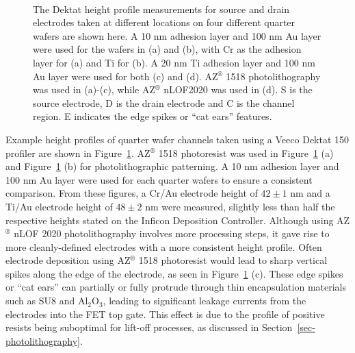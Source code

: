 \documentclass[
  a4paper,
]{scrbook}
\begin{document}
\begin{figure}
\begin{minipage}[t]{0.45\linewidth}
{{}

}

\end{minipage}%
%
\begin{minipage}[t]{0.01\linewidth}

{\centering 

~

}

\end{minipage}%

\caption[The Dektat height profile measurements for source and drain
electrodes taken at different locations on four different quarter
wafers.]{\label{fig-electrodes-dektat}The Dektat height profile
measurements for source and drain electrodes taken at different
locations on four different quarter wafers are shown here. A 10 nm
adhesion layer and 100 nm Au layer were used for the wafers in (a) and
(b), with Cr as the adhesion layer for (a) and Ti for (b). A 20 nm Ti
adhesion layer and 100 nm Au layer were used for both (c) and (d).
AZ\(^\circledR\) 1518 photolithography was used in (a)-(c), while
AZ\(^\circledR\) nLOF2020 was used in (d). S is the source electrode, D
is the drain electrode and C is the channel region. E indicates the edge
spikes or ``cat ears'' features.}

\end{figure}

Example height profiles of quarter wafer channels taken using a Veeco
Dektat 150 profiler are shown in Figure~\ref{fig-electrodes-dektat}.
AZ\(^\circledR\) 1518 photoresist was used in
Figure~\ref{fig-electrodes-dektat} (a) and
Figure~\ref{fig-electrodes-dektat} (b) for photolithographic patterning.
A 10 nm adhesion layer and 100 nm Au layer were used for each quarter
wafers to ensure a consistent comparison. From these figures, a Cr/Au
electrode height of \(42 \pm 1\) nm and a Ti/Au electrode height of
\(48 \pm 2\) nm were measured, slightly less than half the respective
heights stated on the Inficon Deposition Controller. Although using
AZ\(^\circledR\) nLOF 2020 photolithography involves more processing
steps, it gave rise to more cleanly-defined electrodes with a more
consistent height profile. Often electrode deposition using
AZ\(^\circledR\) 1518 photoresist would lead to sharp vertical spikes
along the edge of the electrode, as seen in
Figure~\ref{fig-electrodes-dektat} (c). These edge spikes or ``cat
ears'' can partially or fully protrude through thin encapsulation
materials such as SU8 and Al\(_2\)O\(_3\), leading to significant
leakage currents from the electrodes into the FET top gate. This effect
is due to the profile of positive resists being suboptimal for lift-off
processes, as discussed in Section~\ref{sec-photolithography}.
\end{document}
